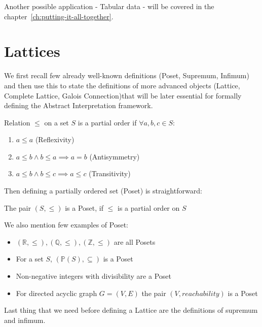 Another possible application - Tabular data - will be covered in the chapter~\ref{ch:putting-it-all-together}.


\section{Lattices} %

We first recall few already well-known definitions (Poset, Supremum, Infimum) and then use this
to state the definitions of more advanced objects (Lattice, Complete Lattice, Galois Connection)that will be later
essential for formally defining the Abstract Interpretation framework.

\begin{defn}
    Relation $\leq$ on a set $S$ is a partial order if $\forall a, b, c \in S$:
    \begin{enumerate}
        \item $a \leq a$ (Reflexivity)
        \item $a \leq b \land b \leq a \implies a = b$ (Antisymmetry)
        \item $a \leq b \land b \leq c \implies a \leq c$ (Transitivity)
    \end{enumerate}
\end{defn}

Then defining a partially ordered set (Poset) is straightforward:

\begin{defn}[Poset]
    The pair $(S, \leq)$ is a Poset, if $\leq$ is a partial order on $S$
\end{defn}

\begin{example}
    We also mention few examples of Poset:
    \begin{itemize}
        \item $(\mathbb{R}, \leq), (\mathbb{Q}, \leq), (\mathbb{Z}, \leq)$ are all Posets
        \item For a set $S$, $(\mathbb{P}(S), \subseteq)$ is a Poset
        \item Non-negative integers with divisibility are a Poset
        \item For directed acyclic graph $G=(V,E)$ the pair $(V, reachability)$ is a Poset
    \end{itemize}
\end{example}

Last thing that we need before defining a Lattice are the definitions of supremum and infimum.

